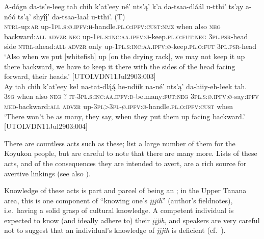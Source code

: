 \documentclass[output=paper,colorlinks,citecolor=brown]{langscibook}
\begin{document}
\begin{exe}
\ex 
\label{fish-heads}
\begin{xlista}
\ex 
\gll A-dógn da-ts'e-łeeg tah chih k'at'eey né' nts'ą' k'a da-tsaa-dláál u-tthi' ts'ąy a-nóó ts'ą' shyį́į́' da-tsaa-łaał {u-tthi'. \textnormal{(T)}} \\
\textsc{ntrl}-up:\textsc{ar} up-\textsc{1pl.s:ø.ipfv:h}-handle.\textsc{pl.o:ipfv:cust:nmz} when also \textsc{neg} backward:\textsc{all} \textsc{advzr} \textsc{neg} up-\textsc{1pl.s:inc:aa.ipfv:ø}-keep.\textsc{pl.o:fut:neg} \textsc{3pl.psr}-head side \textsc{ntrl}-ahead:\textsc{all} \textsc{advzr} only up-\textsc{1pl.s:inc:aa.ipfv:ø}-keep.\textsc{pl.o:fut} \textsc{3pl.psr}-head \\
\glt `Also when we put [whitefish] up [on the drying rack], we may not keep it up there backward, we have to keep it there with the sides of the head facing forward, their heads.' \hfill [UTOLVDN11Jul2903:003]\\
\ex 
\gll Ay tah chih k'at'eey keł na-tat-dlą́ą́ he-ndiik na-né' nts'ą' da-hiiy-eh-łeek tah. \\
\textsc{3sg} when also \textsc{neg} ? \textsc{it-3pl.s:inc:aa.ipfv:d}-be.many:\textsc{fut:neg} \textsc{3pl.s:ø.ipfv:ø}-say:\textsc{ipfv} \textsc{med}-backward:\textsc{all} \textsc{advzr} up-\textsc{3pl>3pl-ø.ipfv:ø}-handle.\textsc{pl.o:ipfv:cust} when \\
\glt `There won't be as many, they say, when they put them up facing backward.' \hfill [UTOLVDN11Jul2903:004]\\
\end{xlista}
\end{exe}

 There are countless acts such as these; \citet[chs. 3, 4, 9, 14]{NelsonRMautnerKBaneG1982} list a large number of them for the Koyukon people, but are careful to note that there are many more. Lists of these acts, and of the consequences they are intended to avert, are a rich source for avertive linkings (see also ).

Knowledge of these acts is part and parcel of being an ; in the Upper Tanana area, this is one component of ``knowing one's \textit{įįjih}'' (author's fieldnotes), i.e.\  having a solid grasp of cultural knowledge. A competent individual is expected to know (and ideally adhere to) their \textit{įįjih}, and  speakers are very careful not to suggest that an individual's knowledge of \textit{įįjih} is deficient (cf.\  \citealt[273]{LovickO2016}).
\end{document}
